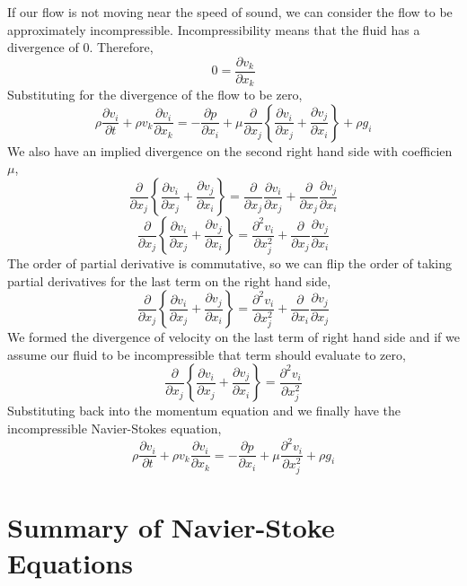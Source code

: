 If our flow is not moving near the speed of sound, we can consider the flow to be approximately incompressible.
Incompressibility means that the fluid has a divergence of $0$. Therefore,
$$0 = \frac{\partial v_{k}}{\partial x_{k}}$$
Substituting for the divergence of the flow to be zero,
$$\rho\frac{\partial v_{i}}{\partial t} + \rho v_{k}\frac{\partial v_{i}}{\partial x_{k}} = -\frac{\partial p}{\partial x_{i}} + \mu\frac{\partial}{\partial x_{j}}\left\{ \frac{\partial v_{i}}{\partial x_{j}} + \frac{\partial v_{j}}{\partial x_{i}} \right\}  +  \rho g_{i}$$
We also have an implied divergence on the second right hand side with coefficien $\mu$,
$$\frac{\partial}{\partial x_{j}}\left\{ \frac{\partial v_{i}}{\partial x_{j}} + \frac{\partial v_{j}}{\partial x_{i}} \right\} = \frac{\partial}{\partial x_{j}}\frac{\partial v_{i}}{\partial x_{j}} + \frac{\partial}{\partial x_{j}}\frac{\partial v_{j}}{\partial x_{i}}$$
$$\frac{\partial}{\partial x_{j}}\left\{ \frac{\partial v_{i}}{\partial x_{j}} + \frac{\partial v_{j}}{\partial x_{i}} \right\} = \frac{\partial^{2} v_{i}}{\partial x_{j}^{2}} + \frac{\partial}{\partial x_{j}}\frac{\partial v_{j}}{\partial x_{i}}$$
The order of partial derivative is commutative, so we can flip the order of taking partial derivatives for the last term on the right hand side,
$$\frac{\partial}{\partial x_{j}}\left\{ \frac{\partial v_{i}}{\partial x_{j}} + \frac{\partial v_{j}}{\partial x_{i}} \right\} = \frac{\partial^{2} v_{i}}{\partial x_{j}^{2}} + \frac{\partial}{\partial x_{i}}\frac{\partial v_{j}}{\partial x_{j}}$$
We formed the divergence of velocity on the last term of right hand side and if we assume our fluid to be incompressible that term should evaluate to zero,
$$\frac{\partial}{\partial x_{j}}\left\{ \frac{\partial v_{i}}{\partial x_{j}} + \frac{\partial v_{j}}{\partial x_{i}} \right\} = \frac{\partial^{2} v_{i}}{\partial x_{j}^{2}}$$
Substituting back into the momentum equation and we finally have the incompressible Navier-Stokes equation,
\begin{equation}
\rho\frac{\partial v_{i}}{\partial t} + \rho v_{k}\frac{\partial v_{i}}{\partial x_{k}} = -\frac{\partial p}{\partial x_{i}} + \mu \frac{\partial^{2} v_{i}}{\partial x_{j}^{2}} + \rho g_{i} 
\label{Incompressible Navier-Stokes Momentum Equation}
\end{equation}

\section{Summary of Navier-Stoke Equations}
\begin{comment}
\end{comment}




